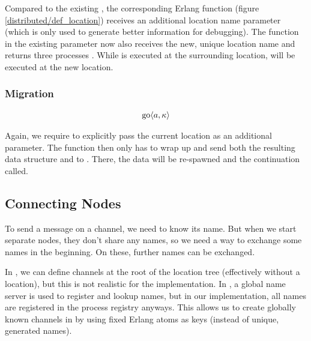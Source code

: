 Compared to the existing ,
the corresponding Erlang function 
(figure \ref{distributed/def_location})
receives an additional location name parameter
(which is only used to generate better information for debugging).
The function in the existing parameter now also receives the new,
unique location name and returns three processes .
While  is executed at the surrounding location,
 will be executed at the new location.



\subsubsection{Migration}

\begin{align*}
  \operatorname{go} \langle a, \kappa \rangle
\end{align*}

Again, we require to explicitly pass the current location
as an additional parameter.
The function 
then only has to wrap up  and send both
the resulting data structure and 
to .
There, the data will be re-spawned and the continuation called.


\subsection{Connecting Nodes}

To send a message on a channel, we need to know its name.
But when we start separate nodes, they don't share any names,
so we need a way to exchange some names in the beginning.
On these, further names can be exchanged.

In \distjoincalc, we can define channels at the root of the location tree
(effectively without a location), but this is not realistic for the
implementation.
In \cite{fournet_jocaml:_2002},
a global name server is used to register and lookup names,
but in our implementation,
all names are registered in the process registry anyways.
This allows us to create globally known channels
in  by using fixed Erlang atoms as keys
(instead of unique, generated names).


